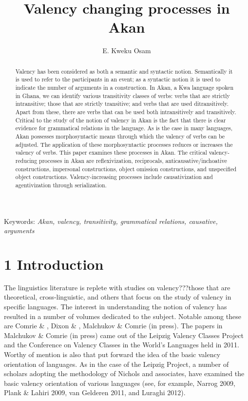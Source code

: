 \documentclass[output=paper]{langsci/langscibook}
\title{Valency changing processes in {Akan} }
\author{%
E. Kweku Osam\affiliation{University of Ghana} 
}
\begin{document}
\begin{abstract}
Valency has been considered as both a semantic and syntactic notion. Semantically it is used to refer to the participants in an event; as a syntactic notion it is used to indicate the number of arguments in a construction. In Akan, a Kwa language spoken in Ghana, we can identify various transitivity classes of verbs: verbs that are strictly intransitive; those that are strictly transitive; and verbs that are used ditransitively. Apart from these, there are verbs that can be used both intransitively and transitively. Critical to the study of the notion of valency in Akan is the fact that there is clear evidence for grammatical relations in the language. As is the case in many languages, Akan possesses morphosyntactic means through which the valency of verbs can be adjusted. The application of these morphosyntactic processes reduces or increases the valency of verbs. This paper examines these processes in Akan. The critical valency-reducing processes in Akan are reflexivization, reciprocals, anticausative/inchoative constructions, impersonal constructions, object omission constructions, and unspecified object constructions. Valency-increasing processes include causativization and agentivization through serialization.
\end{abstract}

Keywords: \emph{Akan, valency, transitivity, grammatical relations, causative, arguments}

\section{1 Introduction}
\begin{styleBodyTextIndent}
The linguistics literature is replete with studies on valency???those that are theoretical, cross-linguistic, and others that focus on the study of valency in specific languages. The interest in understanding the notion of valency has resulted in a number of volumes dedicated to the subject. Notable among these are Comrie \& \citet{Polinsky1993}, Dixon \& \citet{Aikhenvald2000a}, Malchukov \& Comrie (in press). The papers in Malchukov \& Comrie (in press) came out of the Leipzig Valency Classes Project and the Conference on Valency Classes in the World's Languages held in 2011. Worthy of mention is also \citet{NicholsEtAl2004} that put forward the idea of the basic valency orientation of languages. As in the case of the Leipzig Project, a number of scholars adopting the methodology of Nichols and associates, have examined the basic valency orientation of various languages (see, for example, Narrog 2009, Plank \& Lahiri 2009, van Gelderen 2011, and Luraghi 2012).  
\end{styleBodyTextIndent}
\end{document}
